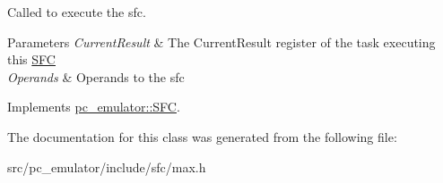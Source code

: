 Called to execute the sfc. 


\begin{DoxyParams}{Parameters}
{\em Current\+Result} & The Current\+Result register of the task executing this \hyperlink{classpc__emulator_1_1SFC}{S\+FC} \\
\hline
{\em Operands} & Operands to the sfc \\
\hline
\end{DoxyParams}


Implements \hyperlink{classpc__emulator_1_1SFC_ab206c80fc0e429c56672b4f6a0ca8635}{pc\+\_\+emulator\+::\+S\+FC}.



The documentation for this class was generated from the following file\+:\begin{DoxyCompactItemize}
\item 
src/pc\+\_\+emulator/include/sfc/max.\+h\end{DoxyCompactItemize}
